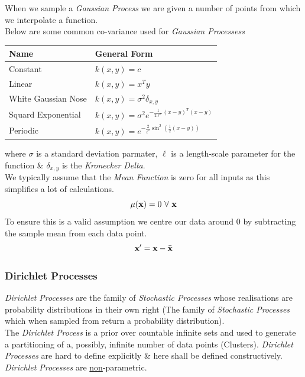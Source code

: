 \documentclass[11pt,a4paper]{article}
\begin{document}

When we sample a \textit{Gaussian Process} we are given a number of points from which we interpolate a function.\\

Below are some common co-variance used for \textit{Gaussian Processess}
\begin{center}\begin{tabular}{|l|l|}
\hline
\textbf{Name}&\textbf{General Form}\\
\hline
Constant&$k(x,y)=c$\\
Linear&$k(x,y)=x^Ty$\\
White Gaussian Nose&$k(x,y)=\sigma^2\delta_{x,y}$\\
Squard Exponential&$k(x,y)=\sigma^2e^{-\frac{1}{2\ell^2}(x-y)^T(x-y)}$\\
Periodic&$k(x,y)=e^{-\frac2{\ell^2}\sin^2\left(\frac{1}{2}(x-y)\right)}$\\
\hline
\end{tabular}\end{center}
where $\sigma$ is a standard deviation parmater, $\ell$ is a length-scale parameter for the function \& $\delta_{x,y}$ is the \textit{Kronecker Delta}.\\

We typically assume that the \textit{Mean Function} is zero for all inputs as this simplifies a lot of calculations.
$$\mu(\textbf{x})=0\ \forall\ \textbf{x}$$
To ensure this is a valid assumption we centre our data around 0 by subtracting the sample mean from each data point.
$$\textbf{x}'=\textbf{x}-\bar{\textbf{x}}$$

\subsubsection{Dirichlet Processes}

\textit{Dirichlet Processes} are the family of \textit{Stochastic Processes} whose realisations are probability distributions in their own right (\ie The family of \textit{Stochastic Processes} which when sampled from return a probability distribution).\\
The \textit{Dirichlet Process} is a prior over countable infinite sets and used to generate a partitioning of a, possibly, infinite number of data points (Clusters).
\textit{Dirichlet Processes} are hard to define explicitly \& here shall be defined constructively.\\
\nb \textit{Dirichlet Processes} are \underline{non}-parametric.\\
\end{document}
